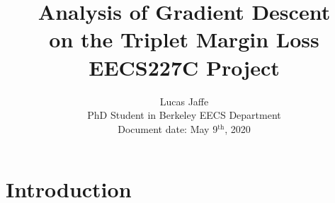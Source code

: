 \documentclass[11pt]{article}
\begin{document}
\author{Lucas Jaffe \\ PhD Student in Berkeley EECS Department \\ Document date: May 9$^{\textrm{th}}$, 2020}

\title{
    Analysis of Gradient Descent \\ on the Triplet Margin Loss \\
    \large EECS227C Project
    }
\maketitle

\medskip




\section{Introduction}
\end{document}
